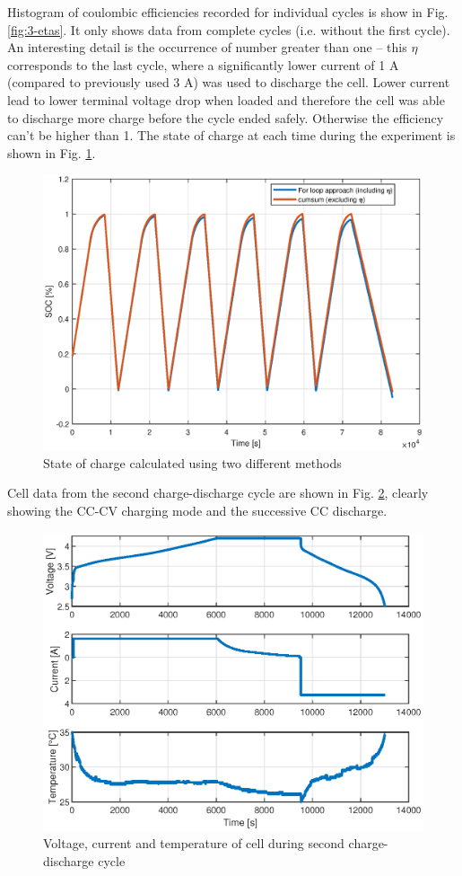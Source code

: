 Histogram of coulombic efficiencies recorded for individual cycles is show in Fig. \ref{fig:3-etas}. It only shows data from complete cycles (i.e. without the first cycle). An interesting detail is the occurrence of number greater than one -- this $\eta$ corresponds to the last cycle, where a significantly lower current of 1 A (compared to previously used 3 A) was used to discharge the cell. Lower current lead to lower terminal voltage drop when loaded and therefore the cell was able to discharge more charge before the cycle ended safely. Otherwise the efficiency can't be higher than 1. The state of charge at each time during the experiment is shown in Fig. \ref{fig:3-soc}.


\begin{figure}[htbp]
    \centering
    \includegraphics[width=0.75\linewidth]{figures/3/soc.eps}
    \caption{State of charge calculated using two different methods}
    \label{fig:3-soc}
\end{figure}

Cell data from the second charge-discharge cycle are shown in Fig. \ref{fig:3-tiled-layout}, clearly showing the CC-CV charging mode and the successive CC discharge.

\begin{figure}[htbp]
    \centering
    \includegraphics[width=0.75\linewidth]{figures/3/tiledlayout.eps}
    \caption{Voltage, current and temperature of cell during second charge-discharge cycle}
    \label{fig:3-tiled-layout}
\end{figure}



